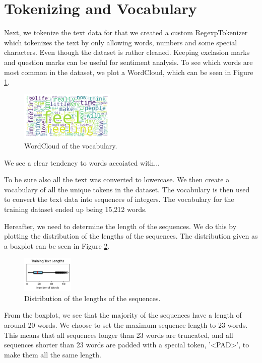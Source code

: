 \section{Tokenizing and Vocabulary}
Next, we tokenize the text data for that we created a custom RegexpTokenizer which tokenizes the text by only allowing words, numbers and some special characters. Even though the dataset is rather cleaned. Keeping exclasion marks and question marks can be useful for sentiment analysis. To see which words are most common in the dataset, we plot a WordCloud, which can be seen in Figure \ref{fig:wordcloud}.
\begin{figure}[H]
    \vspace*{0.7cm}
    \centering
    \includegraphics[width=0.4\textwidth]{figures/wordcloud.png}
    \caption{WordCloud of the vocabulary.}
    \label{fig:wordcloud}
    \vspace*{0.7cm}
\end{figure}
We see a clear tendency to words accoiated with...

To be sure also all the text was converted to lowercase. We then create a vocabulary of all the unique tokens in the dataset. The vocabulary is then used to convert the text data into sequences of integers. The vocabulary for the training dataset ended up being 15,212 words.

Hereafter, we need to determine the length of the sequences. We do this by plotting the distribution of the lengths of the sequences. The distribution given as a boxplot can be seen in Figure \ref{fig:sequence_length}.
\begin{figure}[H]
    \vspace*{0.7cm}
    \centering
    \includegraphics[width=0.22\textwidth]{figures/sentence_length.png}
    \caption{Distribution of the lengths of the sequences.}
    \label{fig:sequence_length}
    \vspace*{0.7cm}
\end{figure}
From the boxplot, we see that the majority of the sequences have a length of around 20 words. We choose to set the maximum sequence length to 23 words. This means that all sequences longer than 23 words are truncated, and all sequences shorter than 23 words are padded with a special token, '<PAD>', to make them all the same length.


